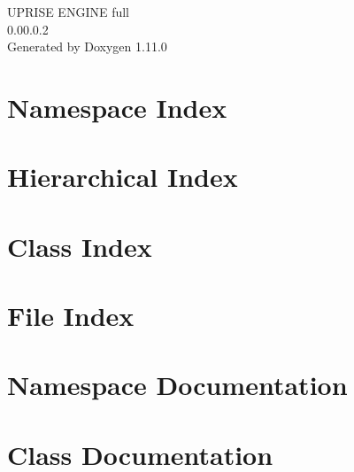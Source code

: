 \documentclass[twoside]{book}
\newcommand{\+}{\discretionary{\mbox{\scriptsize$\hookleftarrow$}}{}{}}
\newcommand{\clearemptydoublepage}{%
    \newpage{\pagestyle{empty}\cleardoublepage}%
  }
\begin{document}
  \raggedbottom
    \hypersetup{pageanchor=false,
                bookmarksnumbered=true,
                pdfencoding=unicode
               }
  \begin{titlepage}
  \vspace*{7cm}
  \begin{center}%
  {\Large UPRISE ENGINE full}\\
  [1ex]\large 0.\+00.\+0.\+2 \\
  \vspace*{1cm}
  {\large Generated by Doxygen 1.11.0}\\
  \end{center}
  \end{titlepage}
  \clearemptydoublepage
  \tableofcontents
  \clearemptydoublepage
  \hypersetup{pageanchor=true}
\chapter{Namespace Index}

\chapter{Hierarchical Index}

\chapter{Class Index}

\chapter{File Index}

\chapter{Namespace Documentation}




\chapter{Class Documentation}
































\end{document}
